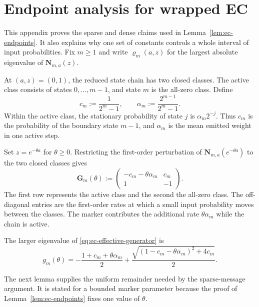 \section{Endpoint analysis for wrapped EC}
\label{app:analytic-details}

This appendix proves the sparse and dense claims used in
Lemma~\ref{lem:ec-endpoints}.  It also explains why one set of constants
controls a whole interval of input probabilities.  Fix $m\geq1$ and write
$\varrho_m(a,z)$ for the largest absolute eigenvalue of
$\mathbf N_{m,a}(z)$.

At $(a,z)=(0,1)$, the reduced state chain has two closed classes.  The active
class consists of states $0,\ldots,m-1$, and state $m$ is the all-zero class.
Define
\begin{equation}
 c_m:=\frac{1}{2^m-1},\qquad
 \alpha_m:=\frac{2^{m-1}}{2^m-1}.
 \label{eq:ec-class-parameters}
\end{equation}
Within the active class, the stationary probability of state $j$ is
$\alpha_m2^{-j}$.  Thus $c_m$ is the probability of the boundary state
$m-1$, and $\alpha_m$ is the mean emitted weight in one active step.

Set $z=e^{-\theta a}$ for $\theta\geq0$.  Restricting the first-order
perturbation of $\mathbf N_{m,a}(e^{-\theta a})$ to the two closed classes
gives
\begin{equation}
 \mathbf G_m(\theta):=
 \begin{pmatrix}
  -c_m-\theta\alpha_m&c_m\\
  1&-1
 \end{pmatrix}.
 \label{eq:ec-effective-generator}
\end{equation}
The first row represents the active class and the second the all-zero class.
The off-diagonal entries are the first-order rates at which a small input
probability moves between the classes.  The marker contributes the additional
rate $\theta\alpha_m$ while the chain is active.

The larger eigenvalue of \eqref{eq:ec-effective-generator} is
\begin{equation}
 g_m(\theta)=
 -\frac{1+c_m+\theta\alpha_m}{2}
 +\frac{\sqrt{(1-c_m-\theta\alpha_m)^2+4c_m}}{2}.
 \label{eq:ec-effective-eigenvalue}
\end{equation}

The next lemma supplies the uniform remainder needed by the sparse-message
argument.  It is stated for a bounded marker parameter because the proof of
Lemma~\ref{lem:ec-endpoints} fixes one value of $\theta$.

